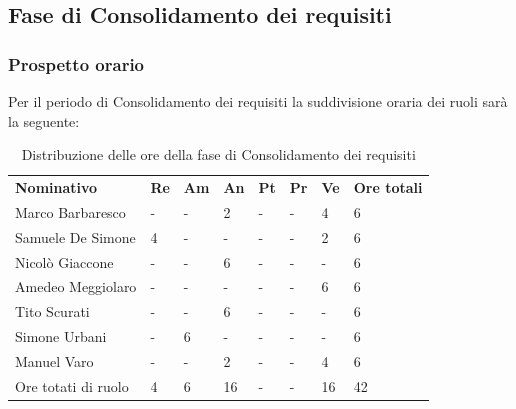     
\subsection{Fase di Consolidamento dei requisiti}
    \subsubsection{Prospetto orario}
    Per il periodo di Consolidamento dei requisiti la suddivisione oraria dei ruoli sarà la seguente:

        \begin{center}
            \begin{table}[ht!]
                \centering
                \caption{Distribuzione delle ore della fase di Consolidamento dei requisiti}
                \vspace{5px}
                \renewcommand{\arraystretch}{1.8}
                \begin{tabular}{p{100px} p{20px} p{20px} p{20px} p{20px} p{20px} p{20px} p{50px} }
                    \rowcolor{logo!70} \textbf{Nominativo} & \textbf{Re} & \textbf{Am} & \textbf{An} & \textbf{Pt} & \textbf{Pr} & \textbf{Ve} & \textbf{Ore totali}\\
                    Marco Barbaresco & - & - & 2 & - & - & 4 & 6\\
                    Samuele De Simone & 4 & - & - & - & - & 2 & 6\\
                    Nicolò Giaccone & - & - & 6 & - & - & - & 6\\
                    Amedeo Meggiolaro & - & - & - & - & - & 6 & 6\\
                    Tito Scurati & - & - & 6 & - & - & - & 6\\
                    Simone Urbani & - & 6 & - & - & - & - & 6\\
                    Manuel Varo & - & - & 2 & - & - & 4 & 6\\
                    Ore totati di ruolo & 4 & 6 & 16 & - & - & 16 & 42\\
                \end{tabular}
            \end{table}
        \end{center}
        \pagebreak

